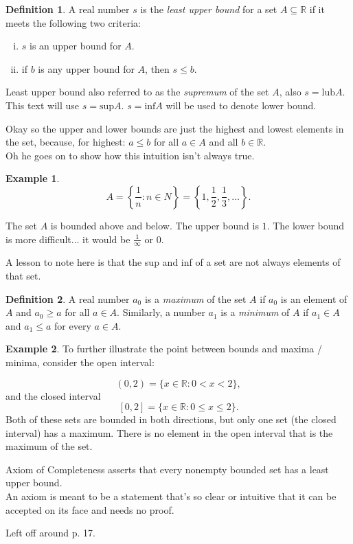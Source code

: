 \documentclass{article}
\numberwithin{equation}{subsection}
\theoremstyle{definition}
\newtheorem{definition}{Definition}
\newtheorem{example}{Example}
\begin{document}
\begin{definition}
    A real number $s$ is the \emph{least upper bound} for a set $A \subseteq \mathbb{R}$
    if it meets the following two criteria:

    \begin{enumerate}[(i)]
        \item $s$ is an upper bound for $A$.\\
        \item if $b$ is any upper bound for $A$, then $s \leq b$.
    \end{enumerate}
\end{definition}

Least upper bound also referred to as the \emph{supremum} of the set $A$, also $s =
\text{lub} A$. This text will use $s = \text{sup} A$. $s = \text{inf} A$ will be used to
denote lower bound.

Okay so the upper and lower bounds are just the highest and lowest elements in the set,
because, for highest: $a \leq b$ for all $a \in A$ and all $b \in \mathbb{R}$.\\

Oh he goes on to show how this intuition isn't always true.

\begin{example}
    
    $$
    A = \left\{ \frac{1}{n}: n \in N \right\} = \left\{ 1, \frac{1}{2}, \frac{1}{3}, \ldots \right\}.
    $$

   The set $A$ is bounded above and below. The upper bound is $1$. The lower bound is
    more difficult... it would be $\frac{1}{\infty}$ or $0$.

    A lesson to note here is that the sup and inf of a set are not always elements of that
set.

\end{example}


\begin{definition}
    A real number $a_0$ is a \emph{maximum} of the set $A$ if $a_0$ is an element of $A$
    and $a_0 \geq a$ for all $a \in A$. Similarly, a number $a_1$ is a \emph{minimum} of
    $A$ if $a_1 \in A$ and $a_1 \leq a$ for every $a \in A$.
\end{definition}


\begin{example}
    To further illustrate the point between bounds and maxima / minima, consider the open
    interval:

    $$
    (0, 2) = \{x \in \mathbb{R}: 0 < x < 2\},
    $$
    and the closed interval
    $$
    [0, 2] = \{x \in \mathbb{R}: 0 \leq x \leq 2\}.
    $$
    Both of these sets are bounded in both directions, but only one set (the closed
    interval) has a maximum. There is no element in the open interval that is the maximum
    of the set.

    Axiom of Completeness asserts that every nonempty bounded set has a least upper bound.
    \\

    An axiom is meant to be a statement that's so clear or intuitive that it can be
    accepted on its face and needs no proof.

\end{example}

Left off around p. 17.
\end{document}
